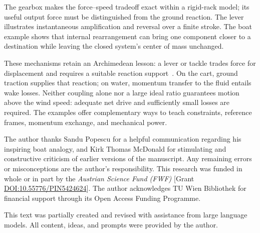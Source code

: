 \documentclass[reprint,aps,pra,longbibliography]{revtex4-2}
\begin{document}
The gearbox makes the force--speed tradeoff exact within a rigid-rack model; its useful output force must be distinguished from the ground reaction. The lever illustrates instantaneous amplification and reversal over a finite stroke. The boat example shows that internal rearrangement can bring one component closer to a destination while leaving the closed system's center of mass unchanged.

These mechanisms retain an Archimedean lesson: a lever or tackle trades force for displacement and requires a suitable reaction support~\cite[pp.~14--17]{dijksterhuis_archimedes_2014}. On the cart, ground traction supplies that reaction; on water, momentum transfer to the fluid entails wake losses. Neither coupling alone nor a large ideal ratio guarantees motion above the wind speed: adequate net drive and sufficiently small losses are required. The examples offer complementary ways to teach constraints, reference frames, momentum exchange, and mechanical power.


\begin{acknowledgments}
The author thanks Sandu Popescu for a helpful communication regarding his inspiring boat analogy, and Kirk Thomas McDonald for stimulating and constructive criticism of earlier versions of the manuscript. Any remaining errors or misconceptions are the author's responsibility.
This research was funded in whole or in part by the \textit{Austrian Science Fund (FWF)} [Grant \href{https://doi.org/10.55776/PIN5424624}{DOI:10.55776/PIN5424624}].
The author acknowledges TU Wien Bibliothek for financial support through its Open Access Funding Programme.

This text was partially created and revised with assistance from large language models. All content, ideas, and prompts were provided by the author.
\end{acknowledgments}


\end{document}
